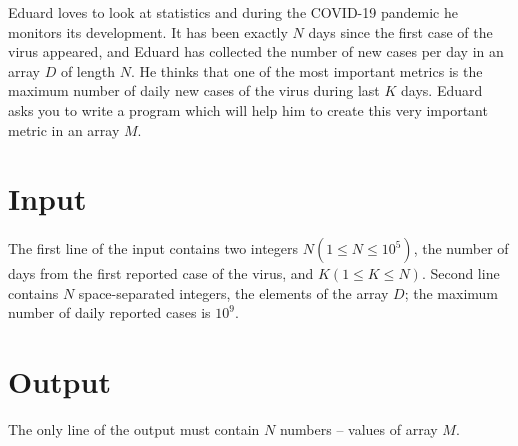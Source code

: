 Eduard loves to look at statistics and during the COVID-19 pandemic he monitors its development.
It has been exactly $N$ days since the first case of the virus appeared,
and Eduard has collected the number of new cases per day in an array $D$ of length $N$.
He thinks that one of the most important metrics is the maximum number of daily new cases of the virus during last $K$ days.
Eduard asks you to write a program which will help him to create this very important metric in an array $M$.


\section*{Input}
The first line of the input contains two integers
$N (1 \leq N \leq 10^5)$, the number of days from the first reported case of the virus, and $K (1 \leq K \leq N)$.
Second line contains $N$ space-separated integers, the elements of the array  $D$; the maximum number of daily reported cases is $10^9$.

\section*{Output}
The only line of the output must contain $N$ numbers -- values of array $M$.
